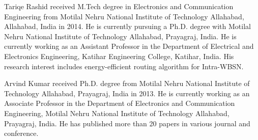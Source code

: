 \vspace{-1cm}
\begin{IEEEbiography}{Tariqe Rashid}
    received M.Tech degree in Electronics and Communication Engineering from Motilal Nehru National Institute of Technology Allahabad, Allahabad, India in 2014. He is currently pursuing a Ph.D. degree with Motilal Nehru National Institute of Technology Allahabad, Prayagraj, India. He is currently working as an Assistant Professor in the Department of Electrical and Electronics Engineering, Katihar Engineering College, Katihar, India.  His research interest includes energy-efficient routing algorithm for Intra-WBSN.  
\end{IEEEbiography}
\vspace{-1cm}
\begin{IEEEbiography}{Arvind Kumar}
    received Ph.D. degree from Motilal Nehru National Institute of Technology
    Allahabad, Prayagraj, India in 2013. He is currently working as an Associate Professor in the Department of
    Electronics and Communication Engineering, Motilal Nehru National Institute of Technology
    Allahabad, Prayagraj,  India. He has published more than 20 papers in various journal and conference.
\end{IEEEbiography}
 

\vfill\vfill\vfill\vfill\vfill\vfill\vfill\vfill\vfill\vfill\vfill
\vfill\vfill\vfill\vfill\vfill\vfill\vfill\vfill\vfill\vfill\vfill

\vspace*{8em}
